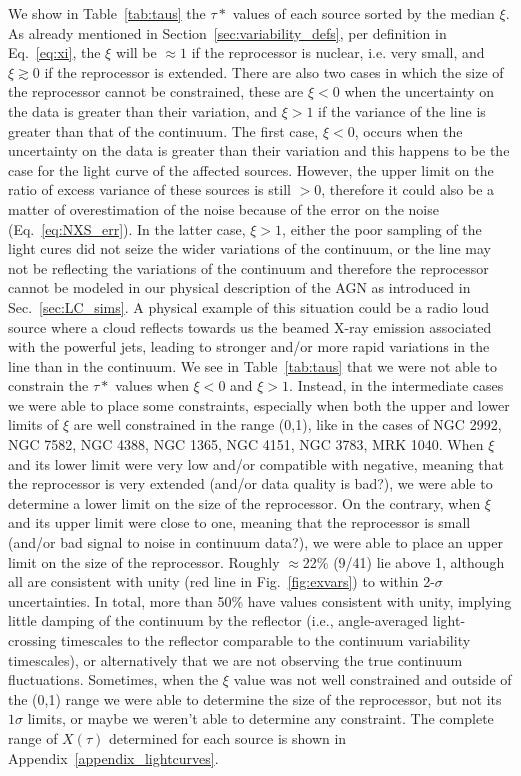 We show in Table~\ref{tab:taus} the $\tau*$ values of each source sorted by the median $\xi$. As already mentioned in Section~\ref{sec:variability_defs}, per definition in Eq.~\ref{eq:xi}, the $\xi$ will be $\approx 1$ if the reprocessor is nuclear, i.e.  very small, and $\xi\gtrsim 0$ if the reprocessor is extended. 
There are also two cases in which the size of the reprocessor cannot be constrained, these are $\xi<0$ when the uncertainty on the data is greater than their variation, and $\xi>1$ if the variance of the \kalfa{} line is greater than that of the continuum. 
The first case, $\xi<0$, occurs when the uncertainty on the data is greater than their variation and this happens to be the case for the \kalfa{} light curve of the affected sources. However, the upper limit on the ratio of excess variance of these sources is still $>0$, therefore it could also be a matter of overestimation of the noise because of the error on the noise (Eq.~\ref{eq:NXS_err}).
In the latter case, $\xi>1$, either the poor sampling of the light cures did not seize the wider variations of the continuum, or the \kalfa{} line may not be reflecting the variations of the continuum and therefore the reprocessor cannot be modeled in our physical description of the AGN as introduced in Sec.~\ref{sec:LC_sims}. A physical example of this situation could be a radio loud source where a cloud reflects towards us the beamed X-ray emission associated with the powerful jets, leading to stronger and/or more rapid variations in the \kalfa{} line than in the continuum.
We see in Table~\ref{tab:taus} that we were not able to constrain the $\tau*$ values when $\xi<0$ and $\xi>1$. Instead, in the intermediate cases we were able to place some constraints, especially when both the upper and lower limits of $\xi$ are well constrained in the range (0,1), like in the cases of NGC 2992, NGC 7582, NGC 4388, NGC 1365, NGC 4151, NGC 3783, MRK 1040. When $\xi$ and its lower limit were very low and/or compatible with negative, meaning that the reprocessor is very extended (and/or data quality is bad?), we were able to determine a lower limit on the size of the reprocessor. On the contrary, when $\xi$ and its upper limit were close to one, meaning that the reprocessor is small (and/or bad signal to noise in continuum data?), we were able to place an upper limit on the size of the reprocessor. Roughly $\approx$22\% (9/41) lie above 1, although all are consistent with unity (red line in Fig.~\ref{fig:exvars}) to within 2-$\sigma$ uncertainties. In total, more than 50\% have values consistent with unity, implying little damping of the continuum by the reflector (i.e., angle-averaged light-crossing timescales to the reflector comparable to the continuum variability timescales), or alternatively that we are not observing the true continuum fluctuations. Sometimes, when the $\xi$ value was not well constrained and outside of the (0,1) range we were able to determine the size of the reprocessor, but not its $1\sigma$ limits, or maybe we weren't able to determine any constraint. The complete range of $X(\tau)$ determined for each source is shown in Appendix~\ref{appendix_lightcurves}.

